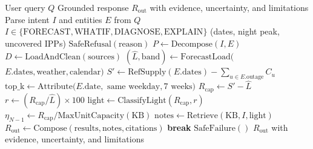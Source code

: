 \documentclass[conference]{IEEEtran}
\begin{document}
\begin{algorithm}[t]
\footnotesize
\caption{GridReserve Agent Execution Pipeline}
\label{alg:agent}
\begin{algorithmic}[1]
\Require User query $Q$
\Ensure Grounded response $R_{\text{out}}$ with evidence,
\Statex \hspace{\algorithmicindent} uncertainty, and limitations
\State Parse intent $I$ and entities $E$ from $Q$
\Statex \hspace{\algorithmicindent} $I \in \{\text{FORECAST}, \text{WHATIF}, \text{DIAGNOSE}, \text{EXPLAIN}\}$
    \Statex \hspace{\algorithmicindent} (dates, night peak, uncovered IPPs)
    \State \Return $\text{SafeRefusal}(\text{reason})$
\EndIf
\State $P \gets \text{Decompose}(I, E)$
\State $D \gets \text{LoadAndClean}(\text{sources})$ 
        \State $(\hat{L}, \text{band}) \gets \text{ForecastLoad}($
        \Statex \hspace{\algorithmicindent} $E.\text{dates}, \text{weather}, \text{calendar})$
        \State $S' \gets \text{RefSupply}(E.\text{dates}) - \sum_{u \in E.\text{outage}} C_u$
        \State $\text{top\_k} \gets \text{Attribute}(E.\text{date},$
        \Statex \hspace{\algorithmicindent} $\text{same weekday}, \text{7 weeks})$
    \EndIf
\EndFor
\State $R_{\text{cap}} \gets S' - \hat{L}$
\State $r \gets (R_{\text{cap}} / \hat{L}) \times 100$
\State $\text{light} \gets \text{ClassifyLight}(R_{\text{cap}}, r)$
\State $\eta_{N-1} \gets R_{\text{cap}} / \text{MaxUnitCapacity}(\text{KB})$
\State $\text{notes} \gets \text{Retrieve}(\text{KB}, I, \text{light})$
 
    \State $R_{\text{out}} \gets \text{Compose}(\text{results}, \text{notes}, \text{citations})$
        \State \textbf{break}
    \EndIf
\EndFor
{}
    \State \Return $\text{SafeFailure}()$
\EndIf
\State \Return $R_{\text{out}}$ with evidence, uncertainty,
\Statex \hspace{\algorithmicindent} and limitations
\end{algorithmic}
\end{algorithm}
\end{document}
